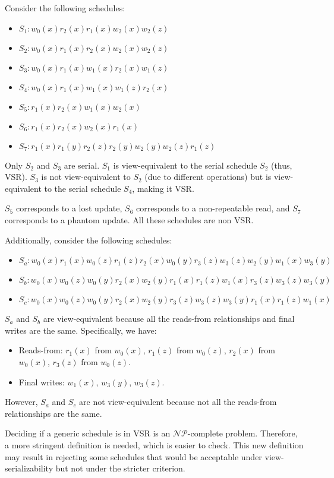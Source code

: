 \begin{example}
    Consider the following schedules:
    \begin{itemize}
        \item $S_1: w_0(x) r_2(x) r_1(x) w_2(x) w_2(z)$
        \item $S_2: w_0(x) r_1(x) r_2(x) w_2(x) w_2(z)$
        \item $S_3: w_0(x) r_1(x) w_1(x) r_2(x) w_1(z)$
        \item $S_4: w_0(x) r_1(x) w_1(x) w_1(z) r_2(x)$
        \item $S_5: r_1(x) r_2(x) w_1(x) w_2(x)$
        \item $S_6: r_1(x) r_2(x) w_2(x) r_1(x)$
        \item $S_7: r_1(x) r_1(y) r_2(z) r_2(y) w_2(y) w_2(z) r_1(z)$
    \end{itemize}
    Only $S_2$ and $S_3$ are serial.
    $S_1$ is view-equivalent to the serial schedule $S_2$ (thus, VSR). 
    $S_3$ is not view-equivalent to $S_2$ (due to different operations) but is view-equivalent to the serial schedule $S_4$, making it VSR.

    $S_5$ corresponds to a lost update, $S_6$ corresponds to a non-repeatable read, and $S_7$ corresponds to a phantom update. All these schedules are non VSR. 
    
    Additionally, consider the following schedules:
    \begin{itemize}
        \item $S_a: w_0(x) r_1(x) w_0(z) r_1(z) r_2(x) w_0(y) r_3(z) w_3(z) w_2(y) w_1(x) w_3(y)$
        \item $S_b: w_0(x) w_0(z) w_0(y) r_2(x) w_2(y) r_1(x) r_1(z) w_1(x) r_3(z) w_3(z) w_3(y)$
        \item $S_c: w_0(x) w_0(z) w_0(y) r_2(x) w_2(y) r_3(z) w_3(z) w_3(y) r_1(x) r_1(z) w_1(x)$
    \end{itemize}
    $S_a$ and $S_b$ are view-equivalent because all the reads-from relationships and final writes are the same. 
    Specifically, we have: 
    \begin{itemize}
        \item Reads-from: $r_1(x)$ from $w_0(x)$, $r_1(z)$ from $w_0(z)$, $r_2(x)$ from $w_0(x)$, $r_3(z)$ from $w_0(z)$.
        \item Final writes: $w_1(x)$, $w_3(y)$, $w_3(z)$.
    \end{itemize}
    However, $S_a$ and $S_c$ are not view-equivalent because not all the reads-from relationships are the same.
\end{example}

Deciding if a generic schedule is in VSR is an $\mathcal{NP}$-complete problem. 
Therefore, a more stringent definition is needed, which is easier to check.
This new definition may result in rejecting some schedules that would be acceptable under view-serializability but not under the stricter criterion.